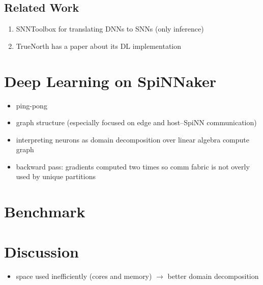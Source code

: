 \documentclass[]{article}
\begin{document}



\subsection{Related Work} %
\label{subsec:related_work}

\begin{enumerate}
  \item SNNToolbox for translating DNNs to SNNs (only inference)
  \item TrueNorth has a paper about its DL implementation
\end{enumerate}




\section{Deep Learning on SpiNNaker}
\label{sec:SpiDNN}

\begin{itemize}
  \item ping-pong
  \item graph structure (especially focused on edge and host--SpiNN
    communication)
  \item interpreting neurons as domain decomposition over linear algebra
    compute graph
  \item backward pass: gradients computed two times so comm fabric is
    not overly used by unique partitions
\end{itemize}

\section{Benchmark}
\label{sec:benchmark}

\section{Discussion}
\label{sec:discussion}

\begin{itemize}
  \item space used inefficiently (cores and memory) $\rightarrow$ better
    domain decomposition
\end{itemize}
\end{document}
